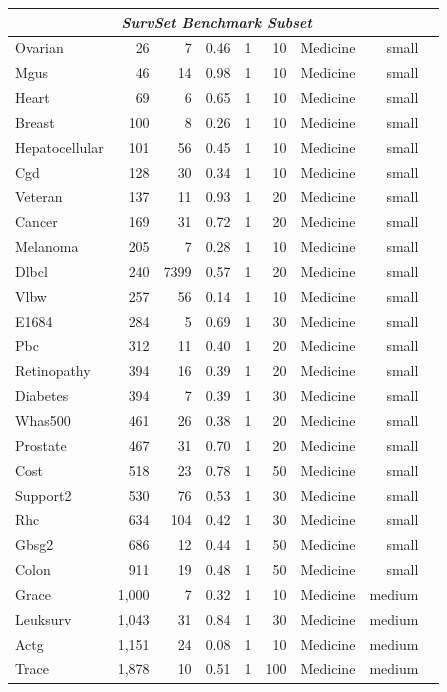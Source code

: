 \begin{longtable}{lrrrrrrrl}
\midrule
\multicolumn{8}{c}{\textit{SurvSet Benchmark Subset}} \\
\midrule
Ovarian & 26 & 7 & 0.46 & 1 & 10 & Medicine & small \\
Mgus & 46 & 14 & 0.98 & 1 & 10 & Medicine & small \\
Heart & 69 & 6 & 0.65 & 1 & 10 & Medicine & small \\
Breast & 100 & 8 & 0.26 & 1 & 10 & Medicine & small \\
Hepatocellular & 101 & 56 & 0.45 & 1 & 10 & Medicine & small \\
Cgd & 128 & 30 & 0.34 & 1 & 10 & Medicine & small \\
Veteran & 137 & 11 & 0.93 & 1 & 20 & Medicine & small \\
Cancer & 169 & 31 & 0.72 & 1 & 20 & Medicine & small \\
Melanoma & 205 & 7 & 0.28 & 1 & 10 & Medicine & small \\
Dlbcl & 240 & 7399 & 0.57 & 1 & 20 & Medicine & small \\
Vlbw & 257 & 56 & 0.14 & 1 & 10 & Medicine & small \\
E1684 & 284 & 5 & 0.69 & 1 & 30 & Medicine & small \\
Pbc & 312 & 11 & 0.40 & 1 & 20 & Medicine & small \\
Retinopathy & 394 & 16 & 0.39 & 1 & 20 & Medicine & small \\
Diabetes & 394 & 7 & 0.39 & 1 & 30 & Medicine & small \\
Whas500 & 461 & 26 & 0.38 & 1 & 20 & Medicine & small \\
Prostate & 467 & 31 & 0.70 & 1 & 20 & Medicine & small \\
Cost & 518 & 23 & 0.78 & 1 & 50 & Medicine & small \\
Support2 & 530 & 76 & 0.53 & 1 & 30 & Medicine & small \\
Rhc & 634 & 104 & 0.42 & 1 & 30 & Medicine & small \\
Gbsg2 & 686 & 12 & 0.44 & 1 & 50 & Medicine & small \\
Colon & 911 & 19 & 0.48 & 1 & 50 & Medicine & small \\
Grace & 1,000 & 7 & 0.32 & 1 & 10 & Medicine & medium \\
Leuksurv & 1,043 & 31 & 0.84 & 1 & 30 & Medicine & medium \\
Actg & 1,151 & 24 & 0.08 & 1 & 10 & Medicine & medium \\
Trace & 1,878 & 10 & 0.51 & 1 & 100 & Medicine & medium \\

\end{longtable}
